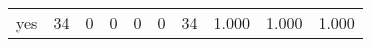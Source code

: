 \begin{longtable}{lp{1.3cm}p{1.3cm}p{1.3cm}p{1.3cm}p{1.3cm}p{1.3cm}p{1.3cm}p{1.3cm}p{1.3cm}}
yes       &                     34 &                                             0 &                                            0 &                                           0 &                                            0 &                                         34 &                                1.000 &                                  1.000 &                                1.000 \\
\end{longtable}

